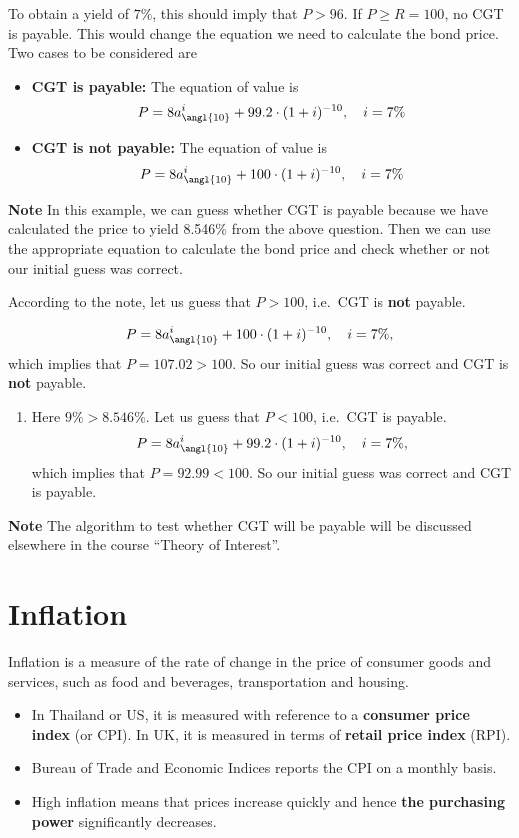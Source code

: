 \documentclass[
]{book}
\providecommand{\tightlist}{%
  \setlength{\itemsep}{0pt}\setlength{\parskip}{0pt}}
\theoremstyle{definition}
\theoremstyle{definition}
\theoremstyle{definition}
\theoremstyle{definition}
\theoremstyle{remark}
\begin{document}
To obtain a yield of \(7\%\), this should imply that \(P > 96\). If
\(P \ge R = 100\), no CGT is payable. This would change the equation we
need to calculate the bond price. Two cases to be considered are

\begin{itemize}
\item
  \textbf{CGT is payable:} The equation of value is
  \[ P = 8 a^i_{\angl{10}} +  99.2\cdot (1+i)^{-10}, \quad i = 7\%\]
\item
  \textbf{CGT is not payable:} The equation of value is
  \[ P = 8 a^i_{\angl{10}} +  100\cdot (1+i)^{-10}, \quad i = 7\%\]
\end{itemize}

\textbf{Note} In this example, we can guess whether CGT is payable because we
have calculated the price to yield 8.546\% from the above question. Then
we can use the appropriate equation to calculate the bond price and
check whether or not our initial guess was correct.

According to the note, let us guess that \(P > 100\), i.e.~CGT is \textbf{not}
payable.

\[ P = 8 a^i_{\angl{10}} +  100\cdot (1+i)^{-10}, \quad i = 7\%,\] which
implies that \(P = 107.02 > 100\). So our initial guess was correct and
CGT is \textbf{not} payable.

\begin{enumerate}
\def\labelenumi{\arabic{enumi}.}
\setcounter{enumi}{2}
\tightlist
\item
  Here \(9\% > 8.546\%\). Let us guess that \(P < 100\), i.e.~CGT is
  payable.
  \[ P = 8 a^i_{\angl{10}} +  99.2\cdot (1+i)^{-10}, \quad i = 7\%,\]
  which implies that \(P = 92.99 < 100\). So our initial guess was
  correct and CGT is payable.
\end{enumerate}

\textbf{Note} The algorithm to test whether CGT will be payable will be
discussed elsewhere in the course ``Theory of Interest''.

\hypertarget{inflation}{%
\section{Inflation}\label{inflation}}

Inflation is a measure of the rate of change in the price of consumer
goods and services, such as food and beverages, transportation and
housing.

\begin{itemize}
\item
  In Thailand or US, it is measured with reference to a \textbf{consumer
  price index} (or CPI). In UK, it is measured in terms of \textbf{retail
  price index} (RPI).
\item
  Bureau of Trade and Economic Indices reports the CPI on a monthly
  basis.
\item
  High inflation means that prices increase quickly and hence \textbf{the
  purchasing power} significantly decreases.
\end{itemize}
\end{document}

